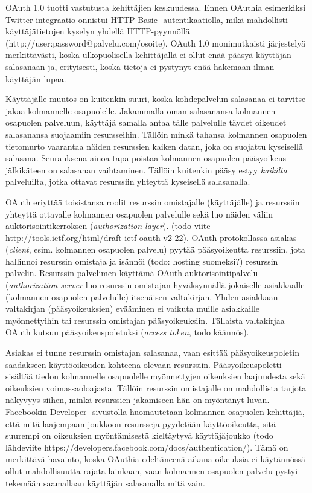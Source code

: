 \documentclass[english,gradu]{tktltiki}
\begin{document}
  OAuth 1.0 tuotti vastutusta kehittäjien keskuudessa. Ennen OAuthia esimerkiksi Twitter-integraatio onnistui HTTP Basic -autentikaatiolla, mikä mahdollisti käyttäjätietojen kyselyn yhdellä HTTP-pyynnöllä (http://user:password@palvelu.com/osoite). OAuth 1.0 monimutkaisti järjestelyä merkittävästi, koska ulkopuolisella kehittäjällä ei ollut enää pääsyä käyttäjän salasanaan ja, erityisesti, koska tietoja ei pystynyt enää hakemaan ilman käyttäjän lupaa.

  Käyttäjälle muutos on kuitenkin suuri, koska kohdepalvelun salasanaa ei tarvitse jakaa kolmannelle osapuolelle. Jakammalla oman salasanansa kolmannen osapuolen palveluun, käyttäjä samalla antaa tälle palvelulle täydet oikeudet salasanansa suojaamiin resursseihin. Tällöin minkä tahansa kolmannen osapuolen tietomurto vaarantaa näiden resurssien kaiken datan, joka on suojattu kyseisellä salasana. Seurauksena ainoa tapa poistaa kolmannen osapuolen pääsyoikeus jälkikäteen on salasanan vaihtaminen. Tällöin kuitenkin pääsy estyy \emph{kaikilta} palveluilta, jotka ottavat resurssiin yhteyttä kyseisellä salasanalla.

  OAuth eriyttää toisistansa roolit resurssin omistajalle (käyttäjälle) ja resurssiin yhteyttä ottavalle kolmannen osapuolen palvelulle sekä luo näiden väliin auktorisointikerroksen (\emph{authorization layer}). (todo viite http://tools.ietf.org/html/draft-ietf-oauth-v2-22). OAuth-protokollassa asiakas (\emph{client}, esim. kolmannen osapuolen palvelu) pyytää pääsyoikeutta resurssiin, jota hallinnoi resurssin omistaja ja isännöi (todo: hosting suomeksi?) resurssin palvelin. Resurssin palvelimen käyttämä OAuth-auktorisointipalvelu (\emph{authorization server} luo resurssin omistajan hyväksynnällä jokaiselle asiakkaalle (kolmannen osapuolen palvelulle) itsenäisen valtakirjan. Yhden asiakkaan valtakirjan (pääsyoikeuksien) evääminen ei vaikuta muille asiakkaille myönnettyihin tai resurssin omistajan pääsyoikeuksiin. Tällaista valtakirjaa OAuth kutsuu pääsyoikeuspoletuksi (\emph{access token}, todo käännös).

  Asiakas ei tunne resurssin omistajan salasanaa, vaan esittää pääsyoikeuspoletin saadakseen käyttöoikeuden kohteena olevaan resurssiin. Pääsyoikeuspoletti sisältää tiedon kolmannelle osapuolelle myönnettyjen oikeuksien laajuudesta sekä oikeuksien voimassaoloajasta. Tällöin resurssin omistajalle on mahdollista tarjota näkyvyys siihen, minkä resurssien jakamiseen hän on myöntänyt luvan. Facebookin Developer -sivustolla huomautetaan kolmannen osapuolen kehittäjiä, että mitä laajempaan joukkoon resursseja pyydetään käyttöoikeutta, sitä suurempi on oikeuksien myöntämisestä kieltäytyvä käyttäjäjoukko (todo lähdeviite https://developers.facebook.com/docs/authentication/). Tämä on merkittävä havainto, koska OAuthia edeltäneenä aikana oikeuksia ei käytännössä ollut mahdollisuutta rajata lainkaan, vaan kolmannen osapuolen palvelu pystyi tekemään saamallaan käyttäjän salasanalla mitä vain.
\end{document}
